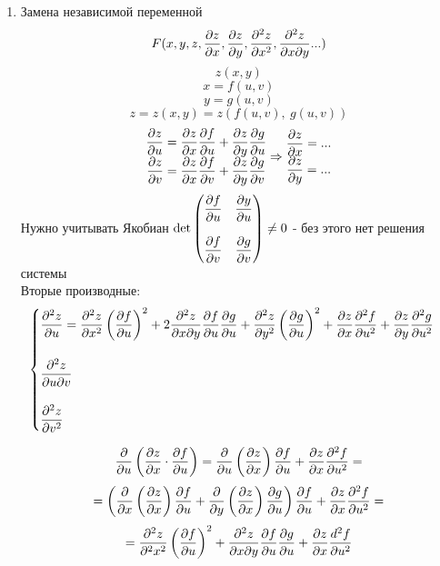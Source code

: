 \documentclass[12pt, fleqn]{article}
\begin{document}
\begin{enumerate}
  \item Замена независимой переменной
  \[F(x, y, z, \dfrac{\partial z}{\partial x}, \dfrac{\partial z}{\partial y}, \dfrac{\partial^2 z}{\partial x^2}, \dfrac{\partial^2 z}{\partial x \partial y}...)\]
  \[z(x,y)\]
  \[x = f(u,v)\]
  \[y = g(u,v)\]
  \[z = z(x,y) = z(f(u,v),\ g(u,v))\]
  \[\begin{matrix}
    \dfrac{\partial z}{\partial u} = \dfrac{\partial z}{\partial x} \dfrac{\partial f}{\partial u} + \dfrac{\partial z}{\partial y} \dfrac{\partial g}{\partial u}\\
    \dfrac{\partial z}{\partial v} = \dfrac{\partial z}{\partial x} \dfrac{\partial f}{\partial v} + \dfrac{\partial z}{\partial y} \dfrac{\partial g}{\partial v}
  \end{matrix} \Rightarrow \begin{matrix}
    \dfrac{\partial z}{\partial x} = ...\\
    \dfrac{\partial z}{\partial y} = ...
  \end{matrix}\]
  Нужно учитывать Якобиан $\det \begin{pmatrix}
    \dfrac{\partial f}{\partial u} & \dfrac{\partial y}{\partial u}\\ \\
    \dfrac{\partial f}{\partial v} & \dfrac{\partial g}{\partial v}
  \end{pmatrix} \neq 0$ - без этого нет решения системы\\
  Вторые производные:
  \[\begin{cases}
    \dfrac{\partial^2 z}{\partial u} = \dfrac{\partial^2 z}{\partial x^2} \left(\dfrac{\partial f}{\partial u}\right)^2 + 2 \dfrac{\partial^2 z}{\partial x \partial y} \dfrac{\partial f}{\partial u} \dfrac{\partial g}{\partial u} + \dfrac{\partial^2 z}{\partial y^2} \left(\dfrac{\partial g}{\partial u}\right)^2 + \dfrac{\partial z}{\partial x} \dfrac{\partial^2 f}{\partial u^2} + \dfrac{\partial z}{\partial y} \dfrac{\partial^2 g}{\partial u^2}\\ \\
    \dfrac{\partial^2 z}{\partial u \partial v}\\ \\
    \dfrac{\partial^2 z}{\partial v^2}
  \end{cases}\]
  \begin{Example}
    \[\dfrac{\partial}{\partial u} \left(\dfrac{\partial z}{\partial x} \cdot \dfrac{\partial f}{\partial u}\right) = \dfrac{\partial}{\partial u} \left(\dfrac{\partial z}{\partial x}\right) \dfrac{\partial f}{\partial u} + \dfrac{\partial z}{\partial x} \dfrac{\partial^2 f}{\partial u^2} = \]
    \[= \left(\dfrac{\partial}{\partial x} \left(\dfrac{\partial z}{\partial x}\right) \dfrac{\partial f}{\partial u} + \dfrac{\partial}{\partial y}\left(\dfrac{\partial z}{\partial x}\right) \dfrac{\partial g}{\partial u}\right) \dfrac{\partial f}{\partial u} + \dfrac{\partial z}{\partial x} \dfrac{\partial^2 f}{\partial u^2} =\]
    \[= \dfrac{\partial^2 z}{\partial^2 x^2} \left(\dfrac{\partial f}{\partial u}\right)^2 + \dfrac{\partial^2 z}{\partial x \partial y} \dfrac{\partial f}{\partial u} \dfrac{\partial g}{\partial u} + \dfrac{\partial z}{\partial x} \dfrac{d^2 f}{\partial u^2}\]
  \end{Example}

\end{enumerate}
\end{document}
